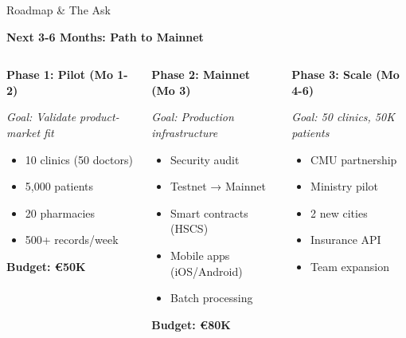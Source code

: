 \documentclass[aspectratio=169,xcolor=dvipsnames,14pt]{beamer}
\begin{document}
\begin{frame}{Roadmap \& The Ask}

  \textbf{\textcolor{FadjmaBlue}{Next 3-6 Months: Path to Mainnet}}

  \begin{columns}[T]
    \begin{column}{0.33\textwidth}
      \textbf{Phase 1: Pilot (Mo 1-2)}

      \textit{Goal: Validate product-market fit}

      \begin{itemize}
        \item 10 clinics (50 doctors)
        \item 5,000 patients
        \item 20 pharmacies
        \item 500+ records/week
      \end{itemize}

      \textbf{Budget: €50K}
    \end{column}

    \begin{column}{0.33\textwidth}
      \textbf{Phase 2: Mainnet (Mo 3)}

      \textit{Goal: Production infrastructure}

      \begin{itemize}
        \item Security audit
        \item Testnet → Mainnet
        \item Smart contracts (HSCS)
        \item Mobile apps (iOS/Android)
        \item Batch processing
      \end{itemize}

      \textbf{Budget: €80K}
    \end{column}

    \begin{column}{0.33\textwidth}
      \textbf{Phase 3: Scale (Mo 4-6)}

      \textit{Goal: 50 clinics, 50K patients}

      \begin{itemize}
        \item CMU partnership
        \item Ministry pilot
        \item 2 new cities
        \item Insurance API
        \item Team expansion
      \end{itemize}


\end{column}
\end{columns}
\end{frame}
\end{document}
